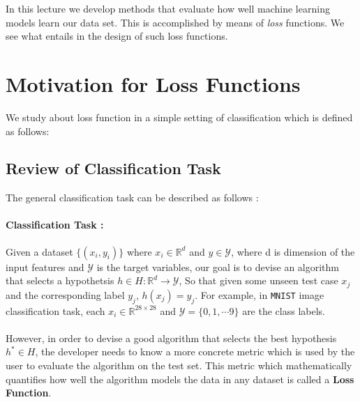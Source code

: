 \documentclass[12pt]{article}
\begin{document}
	\MakeScribeTop


In this lecture we develop methods that evaluate how well machine learning models learn our data set. This is accomplished by means of {\em loss} functions. We see what entails in the design of such loss functions.

\section{Motivation for Loss Functions}
We study about loss function in a simple setting of classification which is defined as follows: 
\subsection{Review of Classification Task}
The general classification task can be described as follows :
\paragraph{Classification Task :}Given a dataset $\{(x_i, y_i)\}$ where $x_i \in \mathbb{R}^d$ and $y \in \mathcal{Y}$, where d is dimension of the input features and $\mathcal{Y}$ is the target variables, our goal is to devise an algorithm that selects a hypothetsis $h \in H : \mathbb{R}^d \rightarrow \mathcal{Y}$,  So that given some unseen test case $x_j$ and the corresponding label $y_j$, $h(x_j) = y_j$. For example, in \verb|MNIST| image classification task, each $x_i \in \mathbb{R}^{28 \times 28}$ and $\mathcal{Y} = \{0, 1, \cdots 9\}$ are the class labels.\\
\\
However, in order to devise a good algorithm that selects the best hypothesis $h^{*} \in H$, the developer needs to know a more concrete metric which is used by the user to evaluate the algorithm on the test set. This metric which mathematically quantifies how well the algorithm models the data in any dataset is called a \textbf{Loss Function}.
\end{document}

